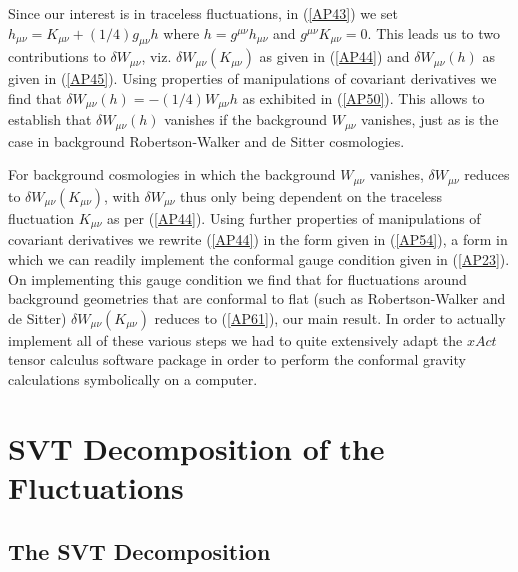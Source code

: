\documentclass[aps]{revtex4}
\begin{document}
Since our interest is in traceless fluctuations, in (\ref{AP43}) we set  $h_{\mu\nu}=K_{\mu\nu}+(1/4)g_{\mu\nu}h$ where $h=g^{\mu\nu}h_{\mu\nu}$ and $g^{\mu\nu}K_{\mu\nu}=0$. This leads us to two contributions to $\delta W_{\mu\nu}$, viz. $\delta W_{\mu\nu}(K_{\mu\nu})$ as given in (\ref{AP44}) and $\delta W_{\mu\nu}(h)$ as given in (\ref{AP45}). Using properties of manipulations of covariant derivatives we find that $\delta W_{\mu\nu}(h)=-(1/4)W_{\mu\nu}h$ as exhibited in (\ref{AP50}). This allows to establish that $\delta W_{\mu\nu}(h)$ vanishes if the background $W_{\mu\nu}$ vanishes, just as is the case in background Robertson-Walker and de Sitter cosmologies. 

For background cosmologies in which the background $W_{\mu\nu}$ vanishes, $\delta W_{\mu\nu}$ reduces to $\delta W_{\mu\nu}(K_{\mu\nu})$, with $\delta W_{\mu\nu}$ thus only being dependent on the traceless fluctuation $K_{\mu\nu}$ as per (\ref{AP44}). Using further properties of manipulations of covariant derivatives we rewrite (\ref{AP44}) in the form given in (\ref{AP54}), a form in which we can readily implement the conformal gauge condition given in (\ref{AP23}). On implementing this gauge condition we find that for fluctuations around background geometries that are conformal to flat (such as Robertson-Walker and de Sitter) $\delta W_{\mu\nu}(K_{\mu\nu})$ reduces to (\ref{AP61}), our main result. In order to actually implement all of these various steps we had to quite extensively adapt the $xAct$ tensor calculus software package in order to perform the conformal gravity calculations symbolically on a computer.



\section{SVT Decomposition of the Fluctuations}
\label{S5}

\subsection{The SVT Decomposition}
\end{document}
